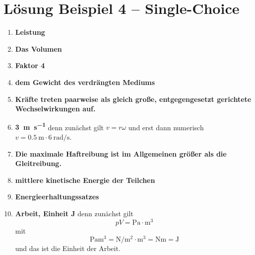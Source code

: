 \documentclass[11pt, a4paper]{article}
\begin{document}
\newpage

\section*{Lösung Beispiel 4 -- Single-Choice}
\begin{enumerate}
    \item \textbf{Leistung}
    \item \textbf{Das Volumen}
    \item \textbf{Faktor 4}
    \item \textbf{dem Gewicht des verdrängten Mediums}
    \item \textbf{Kräfte treten paarweise als gleich große, entgegengesetzt gerichtete Wechselwirkungen auf.}
    \item \textbf{\SI{3}{\metre\per\second}} \quad denn zunächst gilt $v = r\omega$ und erst dann numerisch $v = \SI{0.5}{\metre} \cdot \SI{6}{\radian\per\second}$.
    \item \textbf{Die maximale Haftreibung ist im Allgemeinen größer als die Gleitreibung.}
    \item \textbf{mittlere kinetische Energie der Teilchen}
    \item \textbf{Energieerhaltungssatzes}
    \item \textbf{Arbeit, Einheit \si{\joule}} \quad denn zunächst gilt
    \[
        pV = \si{\pascal \cdot \metre\cubed}
    \]
    mit
    \[
        \si{\pascal\metre\cubed} = \si{\newton\per\metre\squared}\cdot\si{\metre\cubed} = \si{\newton\metre} = \si{\joule}
    \]
    und das ist die Einheit der Arbeit.
\end{enumerate}
\end{document}

